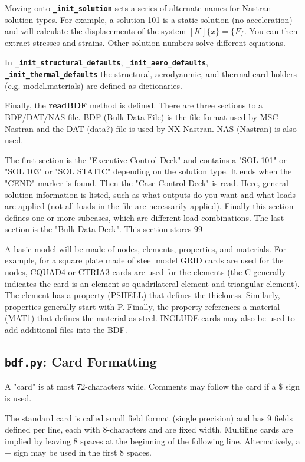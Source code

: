      Moving onto {\bf \tt \_init\_solution} sets a series of alternate names for Nastran solution types.  For example, a solution 101 is a static solution (no acceleration) and will calculate the displacements of the system $[K]\{x\} = \{F\} $.  You can then extract stresses and strains.  Other solution numbers solve different equations.
     
     In {\bf \tt \_init\_structural\_defaults}, {\bf \tt \_init\_aero\_defaults}, {\bf \tt \_init\_thermal\_defaults} the structural, aerodyanmic, and thermal card holders (e.g. model.materials) are defined as dictionaries.

     Finally, the {\bf readBDF} method is defined.  There are three sections to a BDF/DAT/NAS file.  BDF (Bulk Data File) is the file format used by MSC Nastran and the DAT (data?) file is used by NX Nastran.  NAS (Nastran) is also used.

     The first section is the "Executive Control Deck" and contains a "SOL 101" or "SOL 103" or "SOL STATIC" depending on the solution type.  It ends when the "CEND" marker is found. Then the "Case Control Deck" is read.  Here, general solution information is listed, such  as what outputs do you want and what loads are applied (not all loads in the file are necessarily applied).  Finally this section defines one or more subcases, which are different load combinations.  The last section is the "Bulk Data Deck".  This section stores 99%
     
     A basic model will be made of nodes, elements, properties, and materials.  For example, for a square plate made of steel model GRID cards are used for the nodes, CQUAD4 or CTRIA3 cards are used for the elements (the C generally indicates the card is an element so quadrilateral element and triangular element).  The element has a property (PSHELL) that defines the thickness.  Similarly, properties generally start with P.  Finally,  the property references a material (MAT1) that defines the material as steel.  INCLUDE cards may also be used to add additional files into the BDF.
     
 \subsection{{\tt bdf.py}: Card Formatting}
     A "card" is at most 72-characters wide.  Comments may follow the card if a \$ sign is used.
     
     The standard card is called small field format (single precision) and has 9 fields defined per line, each with 8-characters and are fixed width.  Multiline cards are implied by leaving 8 spaces at the beginning of the following line.  Alternatively, a + sign may be used in the first 8 spaces.
     
